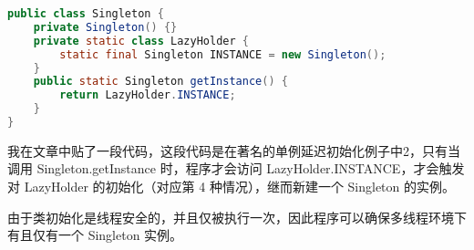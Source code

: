 \documentclass[../../../interview-questions.tex]{subfiles}
\begin{document}
\begin{lstlisting}[language=Java]
public class Singleton {
    private Singleton() {}
    private static class LazyHolder {
        static final Singleton INSTANCE = new Singleton();
    }
    public static Singleton getInstance() {
        return LazyHolder.INSTANCE;
    }
}
\end{lstlisting}

我在文章中贴了一段代码，这段代码是在著名的单例延迟初始化例子中2，只有当调用 Singleton.getInstance 时，程序才会访问 LazyHolder.INSTANCE，才会触发对 LazyHolder 的初始化（对应第 4 种情况），继而新建一个 Singleton 的实例。

由于类初始化是线程安全的，并且仅被执行一次，因此程序可以确保多线程环境下有且仅有一个 Singleton 实例。
\end{document}
